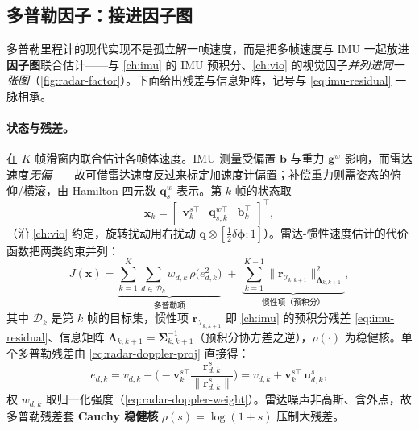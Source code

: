 \subsection{多普勒因子：接进因子图}
\label{subsec:radar-doppler-factor}

多普勒里程计的现代实现不是孤立解一帧速度，而是把多帧速度与 IMU 一起放进\textbf{因子图}联合估计——与 \cref{ch:imu} 的 IMU 预积分、\cref{ch:vio} 的视觉因子\emph{并列进同一张图}（\cref{fig:radar-factor}）。下面给出残差与信息矩阵，记号与 \cref{eq:imu-residual} 一脉相承。

\paragraph{状态与残差。}
在 $K$ 帧滑窗内联合估计各帧体速度。IMU 测量受偏置 $\mathbf b$ 与重力 $\mathbf g^w$ 影响，而雷达速度\emph{无偏}——故可借雷达速度反过来标定加速度计偏置；补偿重力则需姿态的俯仰/横滚，由 Hamilton 四元数 $\mathbf q_s^w$ 表示。第 $k$ 帧的状态取
\begin{equation}
  \mathbf x_k=\begin{bmatrix}\mathbf v^{s\top}_k & \mathbf q_{s,k}^{w\top} & \mathbf b_k^\top\end{bmatrix}^\top,
  \label{eq:radar-state}
\end{equation}
（沿 \cref{ch:vio} 约定，旋转扰动用右扰动 $\mathbf q\otimes[\tfrac12\delta\boldsymbol\phi;1]$）。雷达-惯性速度估计的代价函数把两类约束并列：
\begin{equation}
  J(\mathbf x)=\underbrace{\sum_{k=1}^{K}\sum_{d\in\mathcal D_k} w_{d,k}\,\rho\!\big(e_{d,k}^2\big)}_{\text{多普勒项}}
   \;+\;\underbrace{\sum_{k=1}^{K-1}\big\|\mathbf r_{\mathcal I_{k,k+1}}\big\|^2_{\boldsymbol\Lambda_{k,k+1}}}_{\text{惯性项（预积分）}},
  \label{eq:radar-cost}
\end{equation}
其中 $\mathcal D_k$ 是第 $k$ 帧的目标集，惯性项 $\mathbf r_{\mathcal I_{k,k+1}}$ 即 \cref{ch:imu} 的预积分残差 \cref{eq:imu-residual}、信息矩阵 $\boldsymbol\Lambda_{k,k+1}=\boldsymbol\Sigma_{k,k+1}^{-1}$（预积分协方差之逆），$\rho(\cdot)$ 为稳健核。单个多普勒残差由 \cref{eq:radar-doppler-proj} 直接得：
\begin{equation}
  e_{d,k}=v_{d,k}-\Big(-\mathbf v^{s\top}_k\frac{\mathbf r_{d,k}^s}{\|\mathbf r_{d,k}^s\|}\Big)
   =v_{d,k}+\mathbf v^{s\top}_k\,\mathbf u_{d,k}^s,
  \label{eq:radar-doppler-residual}
\end{equation}
权 $w_{d,k}$ 取归一化强度（\cref{eq:radar-doppler-weight}）。雷达噪声非高斯、含外点，故多普勒残差套 \textbf{Cauchy 稳健核} $\rho(s)=\log(1+s)$ 压制大残差。

